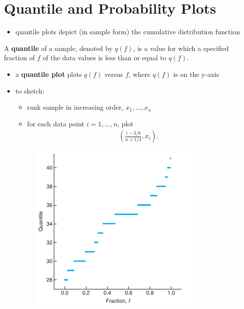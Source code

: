 \documentclass[10pt]{article}
\begin{document}
\section{Quantile and Probability Plots}
\begin{itemize}
    \item quantile plots depict (in sample form) the cumulative distribution function
\end{itemize}
\begin{definition}
    A \textbf{quantile} of a sample, denoted by $q(f)$, is a value for which a specified fraction of $f$ of the data values is less than or equal to $q(f)$.
\end{definition}
\begin{itemize}
    \item a \textbf{quantile plot} plots $q(f)$ versus $f$, where $q(f)$ is on the y-axis
    \item to sketch:
        \begin{itemize}
            \item rank sample in increasing order, $x_1, \ldots, x_n$
            \item for each data point $i = 1, \ldots, n$, plot 
                \begin{gather*}
                    \left( \frac{i-3 / 8}{n + 1 / 4}, x_i \right) 
                .\end{gather*}
        \end{itemize}
        \begin{figure}[h]
            \centering
            \includegraphics[width=0.8\textwidth]{quantilePlot}

\end{figure}
\end{itemize}
\end{document}
